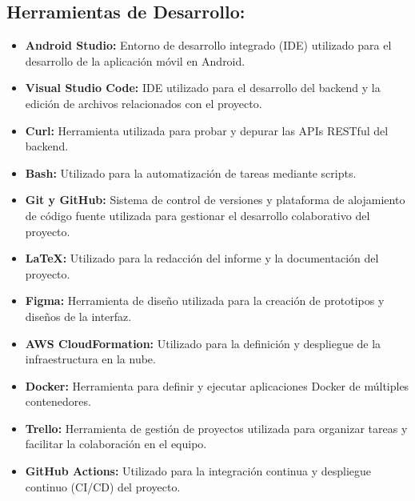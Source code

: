 \subsection{Herramientas de Desarrollo:}
\begin{itemize}
    \item \textbf{Android Studio:} Entorno de desarrollo integrado (IDE) utilizado para el desarrollo de la 
    aplicación móvil en Android.
    \item \textbf{Visual Studio Code:} IDE utilizado para el desarrollo del backend y la edición de archivos 
    relacionados con el proyecto.
    \item \textbf{Curl:} Herramienta utilizada para probar y depurar las APIs RESTful del backend.
    \item \textbf{Bash:} Utilizado para la automatización de tareas mediante scripts.
    \item \textbf{Git y GitHub:} Sistema de control de versiones y plataforma de alojamiento de código fuente 
    utilizada para gestionar el desarrollo colaborativo del proyecto.
    \item \textbf{LaTeX:} Utilizado para la redacción del informe y la documentación del proyecto.
    \item \textbf{Figma:} Herramienta de diseño utilizada para la creación de prototipos y diseños de la interfaz.
    \item \textbf{AWS CloudFormation:} Utilizado para la definición y despliegue de la infraestructura en la nube.
    \item \textbf{Docker:} Herramienta para definir y ejecutar aplicaciones Docker de múltiples contenedores.
    \item \textbf{Trello:} Herramienta de gestión de proyectos utilizada para organizar tareas y facilitar la colaboración en el equipo.
    \item \textbf{GitHub Actions:} Utilizado para la integración continua y despliegue continuo (CI/CD) del proyecto.
\end{itemize}